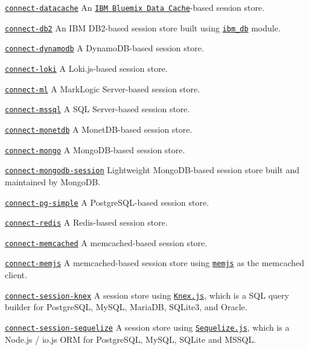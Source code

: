 \href{https://www.npmjs.com/package/connect-datacache}{\tt connect-\/datacache} An \href{http://www.ibm.com/cloud-computing/bluemix/}{\tt I\+BM Bluemix Data Cache}-\/based session store.

\href{https://www.npmjs.com/package/connect-db2}{\tt connect-\/db2} An I\+BM D\+B2-\/based session store built using \href{https://www.npmjs.com/package/ibm_db}{\tt ibm\+\_\+db} module.

\href{https://github.com/ca98am79/connect-dynamodb}{\tt connect-\/dynamodb} A Dynamo\+D\+B-\/based session store.

\href{https://www.npmjs.com/package/connect-loki}{\tt connect-\/loki} A Loki.\+js-\/based session store.

\href{https://www.npmjs.com/package/connect-ml}{\tt connect-\/ml} A Mark\+Logic Server-\/based session store.

\href{https://www.npmjs.com/package/connect-mssql}{\tt connect-\/mssql} A S\+QL Server-\/based session store.

\href{https://www.npmjs.com/package/connect-monetdb}{\tt connect-\/monetdb} A Monet\+D\+B-\/based session store.

\href{https://www.npmjs.com/package/connect-mongo}{\tt connect-\/mongo} A Mongo\+D\+B-\/based session store.

\href{https://www.npmjs.com/package/connect-mongodb-session}{\tt connect-\/mongodb-\/session} Lightweight Mongo\+D\+B-\/based session store built and maintained by Mongo\+DB.

\href{https://www.npmjs.com/package/connect-pg-simple}{\tt connect-\/pg-\/simple} A Postgre\+S\+Q\+L-\/based session store.

\href{https://www.npmjs.com/package/connect-redis}{\tt connect-\/redis} A Redis-\/based session store.

\href{https://www.npmjs.com/package/connect-memcached}{\tt connect-\/memcached} A memcached-\/based session store.

\href{https://www.npmjs.com/package/connect-memjs}{\tt connect-\/memjs} A memcached-\/based session store using \href{https://www.npmjs.com/package/memjs}{\tt memjs} as the memcached client.

\href{https://www.npmjs.com/package/connect-session-knex}{\tt connect-\/session-\/knex} A session store using \href{http://knexjs.org/}{\tt Knex.\+js}, which is a S\+QL query builder for Postgre\+S\+QL, My\+S\+QL, Maria\+DB, S\+Q\+Lite3, and Oracle.

\href{https://www.npmjs.com/package/connect-session-sequelize}{\tt connect-\/session-\/sequelize} A session store using \href{http://sequelizejs.com/}{\tt Sequelize.\+js}, which is a Node.\+js / io.\+js O\+RM for Postgre\+S\+QL, My\+S\+QL, S\+Q\+Lite and M\+S\+S\+QL.

